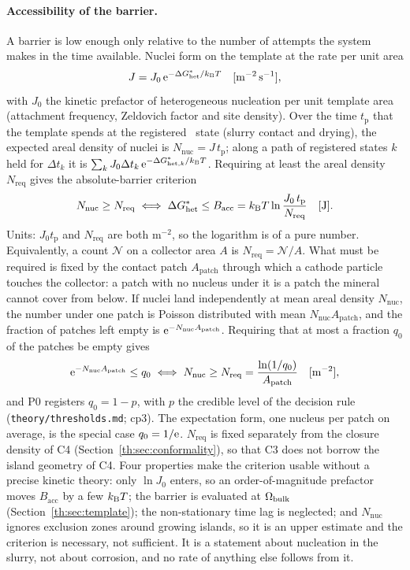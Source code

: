 \paragraph{Accessibility of the barrier.} A barrier is low enough only relative to the number of
attempts the system makes in the time available. Nuclei form on the template at the rate per
unit area
\begin{equation}\label{th:eq:rate}
J=J_0\,\mathrm{e}^{-\Delta G^{*}_\mathrm{het}/k_\mathrm{B} T} \quad[\mathrm{m^{-2}\,s^{-1}}],
\end{equation}
with $J_0$ the kinetic prefactor of heterogeneous nucleation per unit template area (attachment
frequency, Zeldovich factor and site density). Over the time $t_\mathrm{p}$ that the template
spends at the registered \Rs\ state (slurry contact and drying), the expected areal density of
nuclei is $N_\mathrm{nuc}=J\,t_\mathrm{p}$; along a path of registered states $k$ held for
$\Delta t_k$ it is $\sum_kJ_0\Delta t_k\,\mathrm{e}^{-\Delta G^{*}_{\mathrm{het},k}/k_\mathrm{B} T}$. Requiring at least the areal
density $N_\mathrm{req}$ gives the absolute-barrier criterion
\begin{equation}\label{th:eq:access}
N_\mathrm{nuc}\ge N_\mathrm{req}\iff \Delta G^{*}_\mathrm{het}\le B_\mathrm{acc}=k_\mathrm{B} T\ln\frac{J_0\,t_\mathrm{p}}{N_\mathrm{req}} \quad[\mathrm{J}].
\end{equation}
Units: $J_0t_\mathrm{p}$ and $N_\mathrm{req}$ are both m$^{-2}$, so the logarithm is of a pure
number. Equivalently, a count $\mathcal N$ on a collector area $A$ is $N_\mathrm{req}=\mathcal N/A$.
What must be required is fixed by the contact patch $A_\mathrm{patch}$ through which a cathode
particle touches the collector: a patch with no nucleus under it is a patch the mineral cannot
cover from below. If nuclei land independently at mean areal density $N_\mathrm{nuc}$, the number
under one patch is Poisson distributed with mean $N_\mathrm{nuc}A_\mathrm{patch}$, and the fraction
of patches left empty is $\mathrm{e}^{-N_\mathrm{nuc}A_\mathrm{patch}}$. Requiring that at most a fraction
$q_0$ of the patches be empty gives
\begin{equation}\label{th:eq:nreq}
\mathrm{e}^{-N_\mathrm{nuc}A_\mathrm{patch}}\le q_0\iff N_\mathrm{nuc}\ge N_\mathrm{req}=\frac{\ln(1/q_0)}{A_\mathrm{patch}} \quad[\mathrm{m^{-2}}],
\end{equation}
and P0 registers $q_0=1-p$, with $p$ the credible level of the decision rule
(\texttt{theory/thresholds.md}; cp3). The expectation form, one nucleus per patch on average, is the
special case $q_0=1/\mathrm{e}$. $N_\mathrm{req}$ is fixed separately from the closure density of C4 (Section~\ref{th:sec:conformality}),
so that C3 does not borrow the island geometry of C4.
Four properties make the criterion usable without a precise kinetic theory: only $\ln J_0$
enters, so an order-of-magnitude prefactor moves $B_\mathrm{acc}$ by a few $k_\mathrm{B} T$; the barrier
is evaluated at $\Omega_\mathrm{bulk}$ (Section~\ref{th:sec:template}); the non-stationary time lag is neglected;
and $N_\mathrm{nuc}$ ignores exclusion zones around growing islands, so it is an upper estimate
and the criterion is necessary, not sufficient. It is a statement about nucleation in the slurry,
not about corrosion, and no rate of anything else follows from it.

